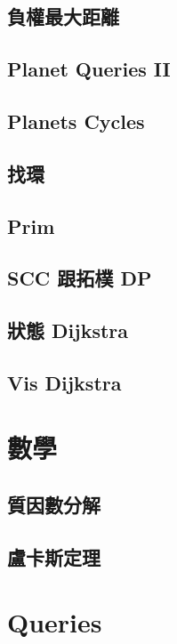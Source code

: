 \subsection{負權最大距離} 

\subsection{Planet Queries II} 

\subsection{Planets Cycles} 

\subsection{找環} 

\subsection{Prim}

\subsection{SCC 跟拓樸 DP}

\subsection{狀態 Dijkstra}

\subsection{Vis Dijkstra}


\section{數學}
\subsection{質因數分解} 

\subsection{盧卡斯定理} 


\section{Queries}
